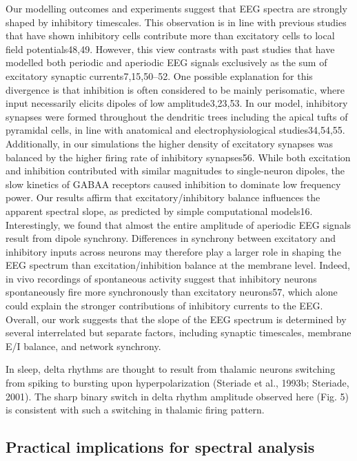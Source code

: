 Our modelling outcomes and experiments suggest that EEG spectra are strongly shaped by inhibitory timescales. This observation is in line with previous studies that have shown inhibitory cells contribute more than excitatory cells to local field potentials48,49. However, this view contrasts with past studies that have modelled both periodic and aperiodic EEG signals exclusively as the sum of excitatory synaptic currents7,15,50–52. One possible explanation for this divergence is that inhibition is often considered to be mainly perisomatic, where input necessarily elicits dipoles of low amplitude3,23,53. In our model, inhibitory synapses were formed throughout the dendritic trees including the apical tufts of pyramidal cells, in line with anatomical and electrophysiological studies34,54,55. Additionally, in our simulations the higher density of excitatory synapses was balanced by the higher firing rate of inhibitory synapses56. While both excitation and inhibition contributed with similar magnitudes to single-neuron dipoles, the slow kinetics of GABAA receptors caused inhibition to dominate low frequency power. Our results affirm that excitatory/inhibitory balance influences the apparent spectral slope, as predicted by simple computational models16. Interestingly, we found that almost the entire amplitude of aperiodic EEG signals result from dipole synchrony. Differences in synchrony between excitatory and inhibitory inputs across neurons may therefore play a larger role in shaping the EEG spectrum than excitation/inhibition balance at the membrane level. Indeed, in vivo recordings of spontaneous activity suggest that inhibitory neurons spontaneously fire more synchronously than excitatory neurons57, which alone could explain the stronger contributions of inhibitory currents to the EEG. Overall, our work suggests that the slope of the EEG spectrum is determined by several interrelated but separate factors, including synaptic timescales, membrane E/I balance, and network synchrony.

In sleep, delta rhythms are thought to result from thalamic neurons switching from spiking to bursting upon hyperpolarization (Steriade et al., 1993b; Steriade, 2001). The sharp binary switch in delta rhythm amplitude observed here (Fig. 5) is consistent with such a switching in thalamic firing pattern. 

\subsection{Practical implications for spectral analysis}
 
